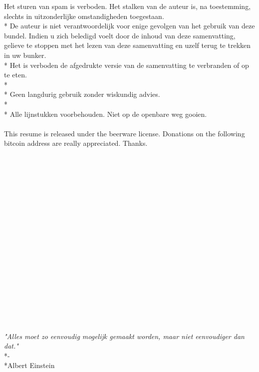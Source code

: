 \documentclass[12pt]{article}
\begin{document}
Het sturen van spam is verboden. Het stalken van de auteur is, na toestemming, slechts in uitzonderlijke omstandigheden toegestaan.\\*
De auteur is niet verantwoordelijk voor enige gevolgen van het gebruik van deze bundel. Indien u zich beledigd voelt door de inhoud van deze samenvatting, gelieve te stoppen met het lezen van deze samenvatting en uzelf terug te trekken in uw bunker.\\*
Het is verboden de afgedrukte versie van de samenvatting te verbranden of op te eten.\\*\\*
Geen langdurig gebruik zonder wiskundig advies.\\*\\*
Alle lijnstukken voorbehouden. Niet op de openbare weg gooien.\\\\
This resume is released under the beerware license. Donations on the following bitcoin address are really appreciated. Thanks.\\\\\\\\\\\\\\\\\\\\\\\\\\\\\\\\\\\\\\
\begin{center}
\textit{"Alles moet zo eenvoudig mogelijk gemaakt worden, maar niet eenvoudiger dan dat."}\\*-\\*Albert Einstein
\end{center}
\end{document}
